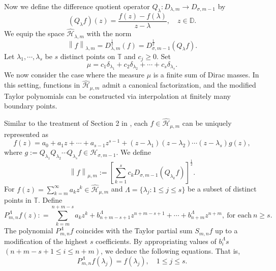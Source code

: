 \documentclass[12pt,reqno]{amsart}
\begin{document}
Now we define the difference quotient operator ${Q_\lambda }:{D_{\lambda ,m}} \to {D_{\sigma ,m - 1}}$ by
\[({Q_\lambda }f)(z) = \frac{{f(z) - f(\lambda )}}{{z - \lambda }},\quad z \in \mathbb{D}.\]
We equip the space $\widehat{\mathcal{H}}_{\lambda,m}$ with the norm
\begin{equation}
\left\| f \right\|_{\lambda ,m} = D_{\lambda ,m}^{\frac{1}{2}}(f) = D_{\sigma ,m - 1}^{\frac{1}{2}}(Q_\lambda f).
\tag{4.2}
\end{equation}
Let ${\lambda _1}, \cdots ,{\lambda _s}$ be $s$ distinct points on $\mathbb{T}$ and ${c_j} \ge 0$. Set
\[\mu  = {c_1}{\delta _{{\lambda _1}}} + {c_2}{\delta _{{\lambda _2}}} +  \cdots  + {c_s}{\delta _{{\lambda _s}}}.\]
We now consider the case where the measure $\mu$ is a finite sum of Dirac masses.
In this setting, functions in $\widehat{\mathcal{H}}_{\mu,m}$ admit a canonical factorization,
and the modified Taylor polynomials can be constructed via interpolation at finitely many boundary points.

Similar to the treatment of Section 2 in \cite{MR4832456}, each $f \in \widehat{\mathcal{H}}_{\mu,m}$ can be uniquely represented as
\begin{equation}
f(z) = a_0 + a_1 z + \cdots + a_{s-1} z^{s-1} + (z - \lambda_1)(z - \lambda_2) \cdots (z - \lambda_s) g(z), \tag{4.3}
\end{equation}
where $g := Q_{\lambda_1} Q_{\lambda_2} \cdots Q_{\lambda_s} f\in \mathcal{H}_{\sigma ,m - 1}$. We define
\begin{equation}
 \left\| f \right\|_{\mu ,m} := [\sum\limits_{k = 1}^s {{c_k}{D_{\sigma ,m - 1}}({Q_{{\lambda _k}}}f)}]^{\frac{1}{2}}. \tag{4.4}
 \end{equation}
For $f(z) = \sum\limits_{k = m}^\infty  {{a_k}{z^k}} \in \widehat{\mathcal{H}}_{\mu,m} $ and $\Lambda  = \{ {\lambda _j}:1 \le j \le s\} $ be a subset of distinct points in $\mathbb{T}$.
Define
\begin{equation}
P_{m,n}^\Lambda f(z): = \sum\limits_{k = m}^{n + m - s} {{a_k}{z^k}}  + b_{n + m - s + 1}^\Lambda {z^{n + m - s + 1}} +  \cdots  + b_{n + m}^\Lambda {z^{n + m}},~ \text{for each} \ n \ge s. \tag{4.5}
\end{equation}
The polynomial $P_{m,n}^\Lambda f$ coincides with the Taylor partial sum $S_{m,n}f$
up to a modification of the highest $s$ coefficients. By appropriating values of $b_i^\Lambda s$ $(n + m - s + 1 \le i \le n + m)$, we deduce the following equations. That is,
\[P_{m,n}^\Lambda f({\lambda _j}) = f({\lambda _j}), \quad 1 \le j \le s.\tag{4.6}\]
\end{document}
